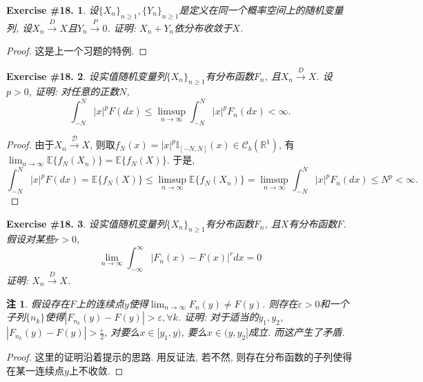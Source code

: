 \documentclass[UTF8, a4paper]{article}
\newtheorem{exercise}{Exercise \#18.}
\newtheorem*{remark}{注}
\begin{document}
\begin{framed}
\begin{exercise}
设\(\{X_n\}_{n\geq 1}, \{Y_n\}_{n\geq 1}\)是定义在同一个概率空间上的随机变量列, 
设\(X_n \xrightarrow{D}X\)且\(Y_n \xrightarrow{P} 0\). 证明: \(X_n + Y_n\)依分布收敛于\(X\).
\end{exercise}
\end{framed}

\begin{proof}
这是上一个习题的特例.
\end{proof}


\begin{framed}
\begin{exercise}
设实值随机变量列\(\{X_n\}_{n\geq 1}\)有分布函数\(F_n\), 且\(X_n \xrightarrow{D}X\).
设\(p>0\), 证明: 对任意的正数\(N\), 
$$
\int_{-N}^N|x|^p F(d x) \leq \limsup _{n \rightarrow \infty} \int_{-N}^N|x|^p F_n(d x)<\infty .
$$
\end{exercise}
\end{framed}

\begin{proof}
由于\(X_n \xrightarrow{\mathcal{D}} X\), 则取\(f_N(x) = |x|^p \mathbb{I}_{[-N,N]}(x) \in \mathscr{C}_b(\mathbb{R}^1)\), 有\(\lim_{n\to\infty} \mathbb{E}\{f_N(X_n)\} = \mathbb{E}\{f_N(X)\}\). 于是, 
$$
\int_{-N}^N|x|^p F(d x) = \mathbb{E}\{f_N(X)\} \leq \limsup_{n\to\infty} \mathbb{E}\{f_N(X_n)\} = \limsup _{n \rightarrow \infty} \int_{-N}^N|x|^p F_n(d x) \leq N^p < \infty.
$$
\end{proof}


\begin{framed}
\begin{exercise}
设实值随机变量列\(\{X_n\}_{n\geq 1}\)有分布函数\(F_n\), 且\(X\)有分布函数\(F\). 假设对某些\(r >0\), 
$$
\lim _{n \rightarrow \infty} \int_{-\infty}^{\infty}\left|F_n(x)-F(x)\right|^r d x=0
$$
证明: \(X_n \xrightarrow{D}X\).
\end{exercise}
\end{framed}

\begin{remark}
假设存在\(F\)上的连续点\(y\)使得\(\lim_{n\to\infty} F_n(y) \neq F(y)\).
则存在\(\varepsilon > 0\)和一个子列\(\{n_k\}\)使得\(|F_{n_k}(y) - F(y)| > {\varepsilon}, \forall k\).
证明: 对于适当的\(y_1,y_2\), \(|F_{n_k}(y) - F(y)| > \frac{\varepsilon}{2}\), 对要么\(x \in [y_1, y)\), 要么\(x \in (y, y_2]\)成立.
而这产生了矛盾.
\end{remark}

\begin{proof}
这里的证明沿着提示的思路. 用反证法, 若不然, 则存在分布函数的子列使得在某一连续点\(y\)上不收敛.

\end{proof}
\end{document}
